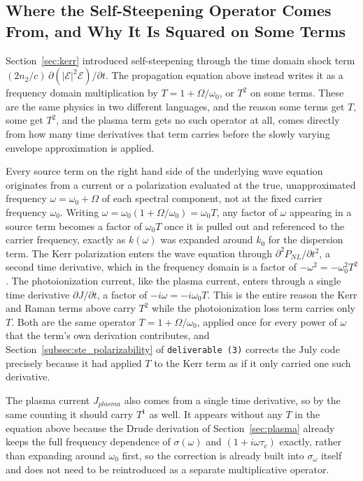 \subsection{Where the Self-Steepening Operator Comes From, and Why It Is Squared on Some Terms}
\label{subsec:selfsteepening}

Section~\ref{sec:kerr} introduced self-steepening through the time domain shock term $(2n_2/c)\,\partial(|\mathcal{E}|^2\mathcal{E})/\partial t$. The propagation equation above instead writes it as a frequency domain multiplication by $T=1+\Omega/\omega_0$, or $T^2$ on some terms. These are the same physics in two different languages, and the reason some terms get $T$, some get $T^2$, and the plasma term gets no such operator at all, comes directly from how many time derivatives that term carries before the slowly varying envelope approximation is applied.

Every source term on the right hand side of the underlying wave equation originates from a current or a polarization evaluated at the true, unapproximated frequency $\omega=\omega_0+\Omega$ of each spectral component, not at the fixed carrier frequency $\omega_0$. Writing $\omega=\omega_0(1+\Omega/\omega_0)=\omega_0T$, any factor of $\omega$ appearing in a source term becomes a factor of $\omega_0T$ once it is pulled out and referenced to the carrier frequency, exactly as $k(\omega)$ was expanded around $k_0$ for the dispersion term. The Kerr polarization enters the wave equation through $\partial^2P_{NL}/\partial t^2$, a second time derivative, which in the frequency domain is a factor of $-\omega^2=-\omega_0^2T^2$. The photoionization current, like the plasma current, enters through a single time derivative $\partial J/\partial t$, a factor of $-i\omega=-i\omega_0T$. This is the entire reason the Kerr and Raman terms above carry $T^2$ while the photoionization loss term carries only $T$. Both are the same operator $T=1+\Omega/\omega_0$, applied once for every power of $\omega$ that the term's own derivation contributes, and Section~\ref{subsec:ste_polarizability} of \texttt{deliverable~(3)} corrects the July code precisely because it had applied $T$ to the Kerr term as if it only carried one such derivative.

The plasma current $J_{plasma}$ also comes from a single time derivative, so by the same counting it should carry $T^1$ as well. It appears without any $T$ in the equation above because the Drude derivation of Section~\ref{sec:plasma} already keeps the full frequency dependence of $\sigma(\omega)$ and $(1+i\omega\tau_c)$ exactly, rather than expanding around $\omega_0$ first, so the correction is already built into $\sigma_\omega$ itself and does not need to be reintroduced as a separate multiplicative operator.

